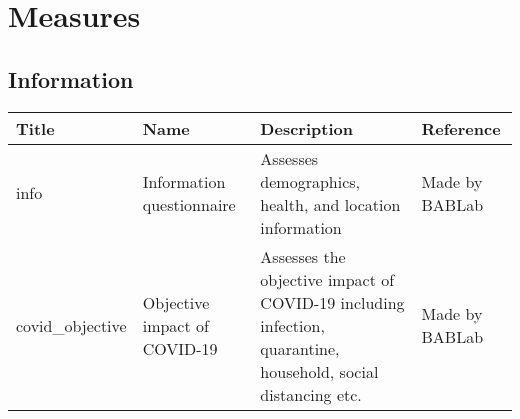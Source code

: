 \documentclass[]{book}
\begin{document}
\hypertarget{measures}{%
\section{Measures}\label{measures}}

\hypertarget{information}{%
\subsection{Information}\label{information}}

\begin{longtable}[]{@{}llll@{}}
\toprule
\begin{minipage}[b]{0.22\columnwidth}\raggedright
Title\strut
\end{minipage} & \begin{minipage}[b]{0.27\columnwidth}\raggedright
Name\strut
\end{minipage} & \begin{minipage}[b]{0.22\columnwidth}\raggedright
Description\strut
\end{minipage} & \begin{minipage}[b]{0.18\columnwidth}\raggedright
Reference\strut
\end{minipage}\tabularnewline
\midrule
\endhead
\begin{minipage}[t]{0.22\columnwidth}\raggedright
info\strut
\end{minipage} & \begin{minipage}[t]{0.27\columnwidth}\raggedright
Information questionnaire\strut
\end{minipage} & \begin{minipage}[t]{0.22\columnwidth}\raggedright
Assesses demographics, health, and location information\strut
\end{minipage} & \begin{minipage}[t]{0.18\columnwidth}\raggedright
Made by BABLab\strut
\end{minipage}\tabularnewline
\begin{minipage}[t]{0.22\columnwidth}\raggedright
covid\_objective\strut
\end{minipage} & \begin{minipage}[t]{0.27\columnwidth}\raggedright
Objective impact of COVID-19\strut
\end{minipage} & \begin{minipage}[t]{0.22\columnwidth}\raggedright
Assesses the objective impact of COVID-19 including infection, quarantine, household, social distancing etc.\strut
\end{minipage} & \begin{minipage}[t]{0.18\columnwidth}\raggedright
Made by BABLab\strut
\end{minipage}\tabularnewline
\bottomrule
\end{longtable}
\end{document}
